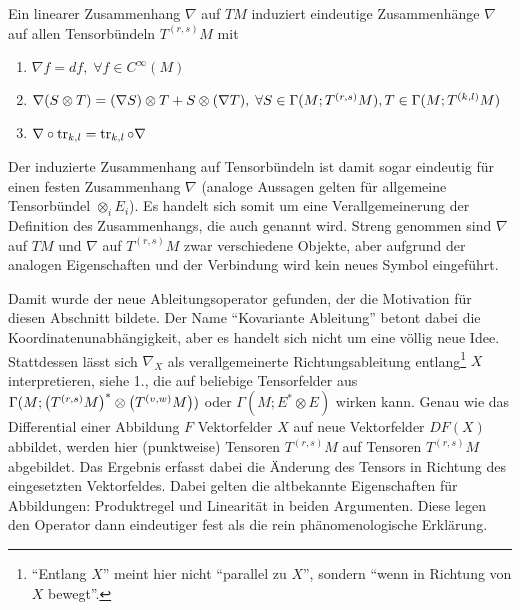 \documentclass[../H_Analysis_main.tex]{subfiles}
\begin{document}
\begin{satz}
Ein linearer Zusammenhang $\nabla$ auf $TM$ induziert eindeutige Zusammenhänge $\nabla$ auf allen Tensorbündeln $T^{(r, s)}M$ mit
\begin{enumerate}
\item $\nabla f = df, \; \forall f \in C^\infty(M)$

\item $\nabla \qty(S \otimes T) = \qty(\nabla S) \otimes T + S \otimes \qty(\nabla T), \; \forall S \in \Gamma(M; T^{(r, s)} M), T \in \Gamma(M; T^{(k, l)} M)$

\item $\nabla \circ \tr_{k, l} = \tr_{k, l} \circ \nabla$
\end{enumerate}
\end{satz}
Der induzierte Zusammenhang auf Tensorbündeln ist damit sogar eindeutig für einen festen Zusammenhang $\nabla$ (analoge Aussagen gelten für allgemeine Tensorbündel $\otimes_i E_i$). Es handelt sich somit um eine Verallgemeinerung der Definition des Zusammenhangs, die auch  genannt wird. 
Streng genommen sind $\nabla$ auf $TM$ und $\nabla$ auf $T^{(r, s)}M$ zwar verschiedene Objekte, aber aufgrund der analogen Eigenschaften und der Verbindung wird kein neues Symbol eingeführt.


Damit wurde der neue Ableitungsoperator gefunden, der die Motivation für diesen Abschnitt bildete. Der Name \enquote{Kovariante Ableitung} betont dabei die Koordinatenunabhängigkeit, aber es handelt sich nicht um eine völlig neue Idee. Stattdessen lässt sich $\nabla_X$ als verallgemeinerte Richtungsableitung entlang\footnote{\enquote{Entlang $X$} meint hier nicht \enquote{parallel zu $X$}, sondern \enquote{wenn in Richtung von $X$ bewegt}.} $X$ interpretieren, siehe 1., die auf beliebige Tensorfelder aus $\Gamma(M; \qty(T^{(r, s)} M)^* \otimes \qty(T^{(v, w)} M))$ oder $\Gamma(M; E^* \otimes E)$ wirken kann. Genau wie das Differential einer Abbildung $F$ Vektorfelder $X$ auf neue Vektorfelder $DF(X)$ abbildet, werden hier (punktweise) Tensoren $T^{(r, s)} M$ auf Tensoren $T^{(r, s)} M$ abgebildet. Das Ergebnis erfasst dabei die Änderung des Tensors in Richtung des eingesetzten Vektorfeldes. Dabei gelten die altbekannte Eigenschaften für Abbildungen: Produktregel und Linearität in beiden Argumenten. Diese legen den Operator dann eindeutiger fest als die rein phänomenologische Erklärung.

\end{document}
